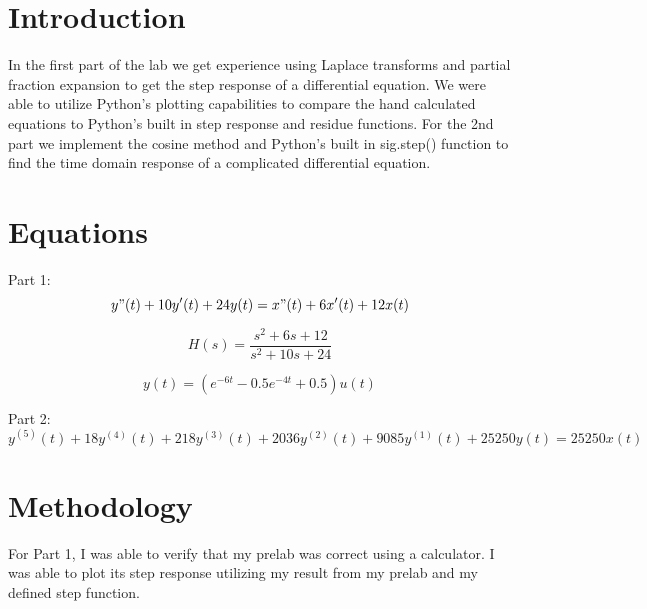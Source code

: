 \documentclass[12pt]{report}
\begin{document}
\section{Introduction}
 

In the first part of the lab we get experience using Laplace transforms and partial fraction expansion to get the step response of a differential equation. We were able to utilize Python's plotting capabilities to compare the hand calculated equations to Python's built in step response and residue functions. For the 2nd part we implement the cosine method and Python's built in sig.step() function to find the time domain response of a complicated differential equation. 

\section{Equations}

Part 1:
\begin{equation*}
y"(t)+10y'(t)+24y(t)=x"(t)+6x'(t)+12x(t)
\end{equation*}

\begin{equation*}
H(s)  = \frac {s^2 + 6s + 12} { s^2 + 10s + 24}
\end{equation*}

\begin{equation*}
y(t) =  (e^{-6t} - 0.5e^{-4t} + 0.5)u(t)
\end{equation*}

Part 2:
\begin{equation*}
y^{(5)}(t)+18y^{(4)}(t)+218y^{(3)}(t)+2036y^{(2)}(t)+9085y^{(1)}(t)+25250y(t) = 25250x(t)
\end{equation*}



\section{Methodology}

For Part 1, I was able to verify that my prelab was correct using a calculator. I was able to plot its step response utilizing my result from my prelab and my defined step function. 
\end{document}
